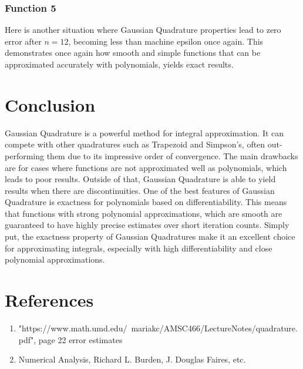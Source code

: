 \documentclass[12pt]{article}
\begin{document}
\subsubsection {Function 5}

Here is another situation where Gaussian Quadrature properties lead to zero 
error after $n = 12$, becoming less than machine epsilon once again. This demonstrates 
once again how smooth and simple functions that can be approximated accurately with 
polynomials, yields exact results.

\section{Conclusion}

Gaussian Quadrature is a powerful method for integral approximation. 
It can compete with other quadratures such as Trapezoid and Simpson's, often 
out-performing them due to its impressive order of convergence. The main drawbacks are for cases where functions are 
not approximated well as polynomials, which leads to poor results. Outside of 
that, Gaussian Quadrature is able to yield results when there are discontinuities. One of the best features of Gaussian Quadrature is 
exactness for polynomials based on differentiability. This means that functions 
with strong polynomial approximations, which are smooth are guaranteed to have 
highly precise estimates over short iteration counts. Simply put, the exactness 
property of Gaussian Quadratures make it an excellent choice for approximating 
integrals, especially with high differentiability and close polynomial 
approximations.


\newpage
\section{References}

\begin{enumerate}
	\item "https://www.math.umd.edu/~mariakc/AMSC466/LectureNotes/quadrature.pdf", page 22 error estimates
	\item Numerical Analysis, Richard L. Burden, J. Douglas Faires, etc.
\end{enumerate}
\end{document}
